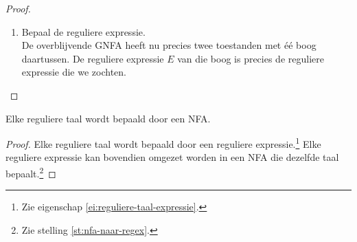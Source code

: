 \documentclass[main.tex]{subfiles}
\begin{document}
\begin{st}
\begin{proof}
\begin{enumerate}
      Noem de machine voor het proces $GNFA_{voor}$ en na het proces $GNFA_{na}$.
      Kies nu een willekeurige string $s \in \Sigma^{*}$.
      \begin{itemize}
      \item
        Als $s$ aanvaard werd door $GNFA_{voor}$ met een pad dat $X$ niet bevat, dan wordt $s$ door datzelfde pad in $GNFA_{na}$ aanvaard.
        Als het pad $X$ wel bevat, dan zijn er toestanden $A$ en $B$ zodat $AX^{n}B$ met $n\in \mathbb{N}_{0}$ een opeenvolging is in het pad. De reguliere expressie op de bogen $AX$, $XX$, $XB$ zijn $E_{1}$, $E_{2}$ en $E_{3}$. Bijgevolg kost van $A$ naar $B$ gaan langs $X$ een stukje string dat voldoet aan $E_{1}E_{2}^{*}E_{3}$. Die reguliere expressie staat in $GNFA_{na}$ in de boog $AB$, dus $s$ wordt ook aanvaard door $GNFA_{na}$.
      \item
        Als $s$ aanvaard wordt door $GNFA_{na}$ dan bevat het acceptatiepad alleen maar toestanden verschillend van $X$. Op een boog van $A$ naar $B$ staat de reguliere expressie $E_{4}|E_{1}E_{2}^{*}E_{3}$. Die reguliere expressie gebruiken kost een stukje string dat voldoet aan $E_{4}$ of $E_{1}E_{2}^{*}E_{3}$. In $GNFA_{voor}$ komt dat overeen met ofwel boog $AB$ volgen, ofwel $AX$, gevolgd door $n$ keer $XX$ en $XB$. Dit houdt in dat de string ofwel het pad langs $X$ nodig had, ofwel het pad zonder $X$, langs $A$ en $B$. In beide gevallen aanvaardt $GNFA_{voor}$ ook $s$.
      \end{itemize}
    \item Bepaal de reguliere expressie.\\
      De overblijvende GNFA heeft nu precies twee toestanden met \'e\'e boog daartussen.
      De reguliere expressie $E$ van die boog is precies de reguliere expressie die we zochten.
    \end{enumerate}
  \end{proof}
\end{st}

\begin{gev}
  \label{gev:reguliere-taal-NFA}
  Elke reguliere taal wordt bepaald door een NFA.
  
  \begin{proof}
    Elke reguliere taal wordt bepaald door een reguliere expressie.\footnote{Zie eigenschap \ref{ei:reguliere-taal-expressie}.}
    Elke reguliere expressie kan bovendien omgezet worden in een NFA die dezelfde taal bepaalt.\footnote{Zie stelling \ref{st:nfa-naar-regex}.}
  \end{proof}
\end{gev}
\end{document}
